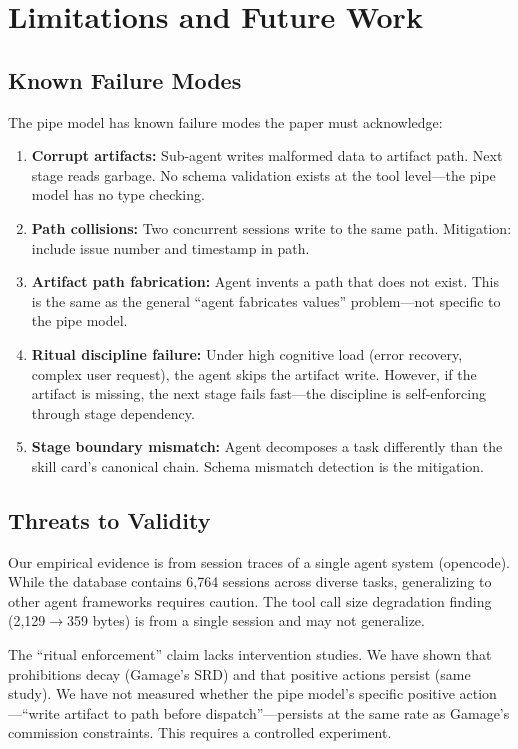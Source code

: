 \documentclass[11pt,a4paper]{article}
\begin{document}
\section{Limitations and Future Work}
\label{sec:limitations}

\subsection{Known Failure Modes}
The pipe model has known failure modes the paper must acknowledge:

\begin{enumerate}[nosep]
  \item \textbf{Corrupt artifacts:} Sub-agent writes malformed data to artifact path. Next stage reads garbage. No schema validation exists at the tool level---the pipe model has no type checking.
  \item \textbf{Path collisions:} Two concurrent sessions write to the same path. Mitigation: include issue number and timestamp in path.
  \item \textbf{Artifact path fabrication:} Agent invents a path that does not exist. This is the same as the general ``agent fabricates values'' problem---not specific to the pipe model.
  \item \textbf{Ritual discipline failure:} Under high cognitive load (error recovery, complex user request), the agent skips the artifact write. However, if the artifact is missing, the next stage fails fast---the discipline is self-enforcing through stage dependency.
  \item \textbf{Stage boundary mismatch:} Agent decomposes a task differently than the skill card's canonical chain. Schema mismatch detection is the mitigation.
\end{enumerate}

\subsection{Threats to Validity}
Our empirical evidence is from session traces of a single agent system (opencode). While the database contains 6,764 sessions across diverse tasks, generalizing to other agent frameworks requires caution. The tool call size degradation finding (2,129$\to$359 bytes) is from a single session and may not generalize.

The ``ritual enforcement'' claim lacks intervention studies. We have shown that prohibitions decay (Gamage's SRD) and that positive actions persist (same study). We have not measured whether the pipe model's specific positive action---``write artifact to path before dispatch''---persists at the same rate as Gamage's commission constraints. This requires a controlled experiment.
\end{document}
